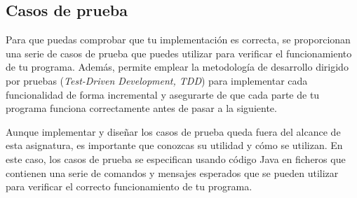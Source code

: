 \documentclass[
    a4paper, %
    12pt, %
]{CSSullivanBusinessReport}
\begin{document}
\subsection{Casos de prueba}\label{sec:casos-prueba}

Para que puedas comprobar que tu implementación es correcta, se proporcionan una serie de casos de prueba que puedes utilizar para verificar el funcionamiento de tu programa. Además, permite emplear la metodología de desarrollo dirigido por pruebas (\textit{Test-Driven Development, TDD}) para implementar cada funcionalidad de forma incremental y asegurarte de que cada parte de tu programa funciona correctamente antes de pasar a la siguiente.

Aunque implementar y diseñar los casos de prueba queda fuera del alcance de esta asignatura, es importante que conozcas su utilidad y cómo se utilizan. En este caso, los casos de prueba se especifican usando código Java en ficheros que contienen una serie de comandos y mensajes esperados que se pueden utilizar para verificar el correcto funcionamiento de tu programa.
\end{document}
